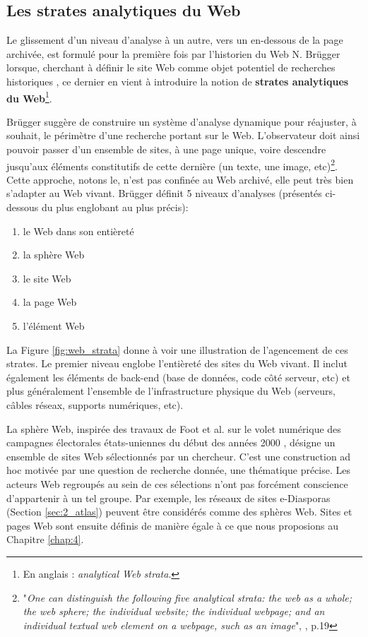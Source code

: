 \documentclass[symmetric,justified,marginals=raggedouter]{tufte-book}
\begin{document}
\subsection{Les strates analytiques du Web}

\par\noindent Le glissement d'un niveau d'analyse à un autre, vers un en-dessous de la page archivée, est formulé pour la première fois par l'historien du Web N. Brügger lorsque, cherchant à définir le site Web comme objet potentiel de recherches historiques \citep{brugger_website_2009}, ce dernier en vient à introduire la notion de \textbf{strates analytiques du Web}\footnote{En anglais : \textit{analytical Web strata}.}.

Brügger suggère de construire un système d'analyse dynamique pour réajuster, à souhait, le périmètre d'une recherche portant sur le Web. L'observateur doit ainsi pouvoir passer d'un ensemble de sites, à une page unique, voire descendre jusqu'aux éléments constitutifs de cette dernière (un texte, une image, etc)\footnote{"\textit{One can distinguish the following five analytical strata: the web as a whole; the web sphere; the individual website; the individual webpage; and an individual textual web element on a webpage, such as an image}", \citep{brugger_website_2009}, p.19}. 
Cette approche, notons le, n'est pas confinée au Web archivé, elle peut très bien s'adapter au Web vivant. Brügger définit 5 niveaux d'analyses (présentés ci-dessous du plus englobant au plus précis):

\begin{enumerate}
\setlength\itemsep{0em}
\item le Web dans son entièreté 
\item la sphère Web
\item le site Web
\item la page Web
\item l'élément Web
\end{enumerate} 

\par\noindent La Figure \ref{fig:web_strata} donne à voir une illustration de l'agencement de ces strates. Le premier niveau englobe l'entièreté des sites du Web vivant. Il inclut également les éléments de back-end (base de données, code côté serveur, etc) et plus généralement l'ensemble de l'infrastructure physique du Web (serveurs, câbles réseax, supports numériques, etc).

La sphère Web, inspirée des travaux de Foot et al. sur le volet numérique des campagnes électorales états-uniennes du début des années 2000 \citep{foot_web_2006}, désigne un ensemble de sites Web sélectionnés par un chercheur. C'est une construction ad hoc motivée par une question de recherche donnée, une thématique précise. Les acteurs Web regroupés au sein de ces sélections n'ont pas forcément conscience d'appartenir à un tel groupe. Par exemple, les réseaux de sites e-Diasporas (Section \ref{sec:2_atlas}) peuvent être considérés comme des sphères Web. Sites et pages Web sont ensuite définis de manière égale à ce que nous proposions au Chapitre \ref{chap:4}.
\end{document}
